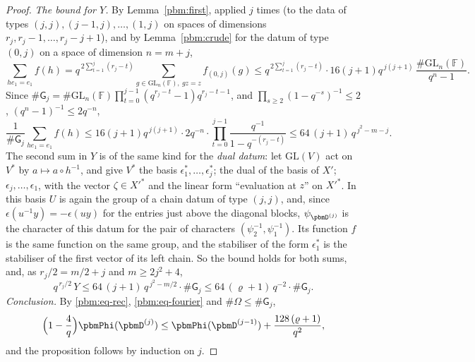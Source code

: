 \documentclass[10pt]{amsart}
\theoremstyle{definition}
\theoremstyle{remark}
\providecommand{\auF}{\mathbb F}
\providecommand{\auGL}{\mathrm{GL}}
\begin{document}
\begin{proof}
\emph{The bound for $Y$.} By Lemma~\ref{pbm:first}, applied $j$ times (to the data of types $(j,j),
(j-1,j),\dots,(1,j)$ on spaces of dimensions $r_j,r_j-1,\dots,r_j-j+1$), and by
Lemma~\ref{pbm:crude} for the datum of type $(0,j)$ on a space of dimension $n=m+j$,
\[
\sum_{he_1=e_1}f(h)=q^{\,2\sum_{t=1}^j(r_j-t)}\sum_{g\in\auGL_n(\auF),\ gz=z}f_{(0,j)}(g)\le q^{\,2\sum_{t=1}^j(
r_j-t)}\cdot16(j+1)q^{\,j(j+1)}\,\frac{\#\auGL_n(\auF)}{q^n-1}.
\]
Since $\#\mathsf G_j=\#\auGL_n(\auF)\prod_{t=0}^{j-1}(q^{r_j-t}-1)q^{r_j-t-1}$, and $\prod_{s\ge2}(1-
q^{-s})^{-1}\le2$, $(q^n-1)^{-1}\le2q^{-n}$,
\[
\frac1{\#\mathsf G_j}\sum_{he_1=e_1}f(h)\le16(j+1)q^{\,j(j+1)}\cdot2q^{-n}\cdot\prod_{t=0}^{j-1}\frac{q^{-1}}{1-
q^{-(r_j-t)}}\le64\,(j+1)\,q^{\,j^2-m-j}.
\]
The second sum in $Y$ is of the same kind for the \emph{dual datum}: let $\auGL(V)$ act on $V^*$ by
$a\mapsto a\circ h^{-1}$, and give $V^*$ the basis $\epsilon_1^*,\dots,\epsilon_j^*$; the dual of
the basis of $X'$; $\epsilon_j,\dots,\epsilon_1$, with the vector $\zeta\in X'^*$ and the linear form
``evaluation at $z$'' on $X'^*$. In this basis $U$ is again the group of a chain datum of type
$(j,j)$, and, since $\epsilon(u^{-1}y)=-\epsilon(uy)$ for the entries just above the diagonal
blocks, $\psi_{\pbmD^{(j)}}$ is the character of this datum for the pair of characters $(\psi_2^{-1},
\psi_1^{-1})$. Its function $f$ is the same function on the same group, and the stabiliser of the
form $\epsilon_1^*$ is the stabiliser of the first vector of its left chain. So the bound holds
for both sums, and, as $r_j/2=m/2+j$ and $m\ge2j^2+4$,
\[
q^{\,r_j/2}\,Y\le64\,(j+1)\,q^{\,j^2-m/2}\cdot\#\mathsf G_j\le64\,(\varrho+1)\,q^{-2}\cdot\#\mathsf G_j .
\]
\emph{Conclusion.} By \eqref{pbm:eq-rec}, \eqref{pbm:eq-fourier} and $\#\Omega\le\#\mathsf G_j$,
\[
\Bigl(1-\frac4q\Bigr)\pbmPhi(\pbmD^{(j)})\le\pbmPhi(\pbmD^{(j-1)})+\frac{128\,(\varrho+1)}{q^2},
\]
and the proposition follows by induction on $j$.
\end{proof}
\end{document}
